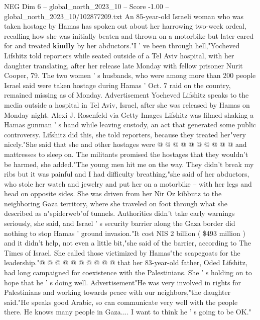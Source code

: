 \begin{textsample}{NEG Dim 6 – global\_north\_2023\_10 – Score -1.00 – global\_north\_2023\_10/102877209.txt}  \label{ex:f6_neg_256}
An 85-year-old Israeli woman who was taken hostage by Hamas has spoken out about her harrowing two-week ordeal, recalling how she was initially beaten and thrown on a motorbike but later cared for and treated \textbf{kindly} by her abductors."I ' ve been through hell,"Yocheved Lifshitz told reporters while seated outside of a Tel Aviv hospital, with her daughter translating, after her release late Monday with fellow prisoner Nurit Cooper, 79.
The two women ' s husbands, who were among more than 200 people Israel said were taken hostage during Hamas ' Oct. 7 raid on the country, remained missing as of Monday.
Advertisement Yocheved Lifshitz speaks to the media outside a hospital in Tel Aviv, Israel, after she was released by Hamas on Monday night.
Alexi J.
Rosenfeld via Getty Images Lifshitz was filmed shaking a Hamas gunman ' s hand while leaving custody, an act that generated some public controversy.
Lifshitz did this, she told reporters, because they treated her"very nicely."She said that she and other hostages were @ @ @ @ @ @ @ @ @ @ and mattresses to sleep on.
The militants promised the hostages that they wouldn't be harmed, she added."The young men hit me on the way.
They didn't break my ribs but it was painful and I had difficulty breathing,"she said of her abductors, who stole her watch and jewelry and put her on a motorbike -- with her legs and head on opposite sides.
She was driven from her Nir Oz kibbutz to the neighboring Gaza territory, where she traveled on foot through what she described as a"spiderweb"of tunnels.
Authorities didn't take early warnings seriously, she said, and Israel ' s security barrier along the Gaza border did nothing to stop Hamas ' ground invasion."It cost NIS 2 billion ( \$493 million ) and it didn't help, not even a little bit,"she said of the barrier, according to The Times of Israel.
She called those victimized by Hamas"the scapegoats for the leadership."@ @ @ @ @ @ @ @ @ @ that her 83-year-old father, Oded Lifshitz, had long campaigned for coexistence with the Palestinians.
She ' s holding on to hope that he ' s doing well.
Advertisement"He was very involved in rights for Palestinians and working towards peace with our neighbors,"the daughter said."He speaks good Arabic, so can communicate very well with the people there.
He knows many people in Gaza....
I want to think he ' s going to be OK."

\end{textsample}
